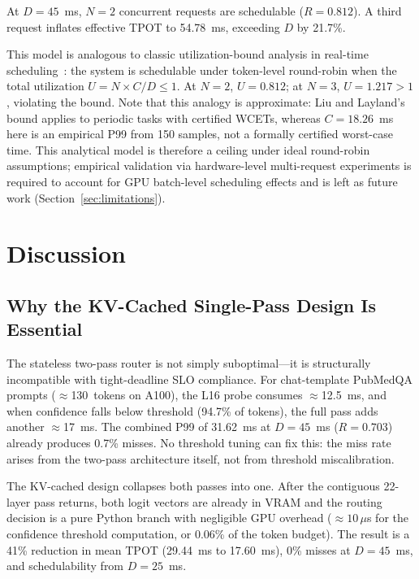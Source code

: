 \documentclass[conference]{IEEEtran}
\begin{document}
At $D=45$~ms, $N=2$ concurrent requests are schedulable ($R=0.812$).
A third request inflates effective TPOT to 54.78~ms, exceeding $D$ by 21.7\%.

This model is analogous to classic utilization-bound analysis in
real-time scheduling~\cite{liu1973scheduling}: the system is schedulable
under token-level round-robin when the total utilization
$U = N \times C / D \leq 1$.
At $N{=}2$, $U = 0.812$; at $N{=}3$, $U = 1.217 > 1$, violating the bound.
Note that this analogy is approximate: Liu and Layland's bound applies to
periodic tasks with certified WCETs, whereas $C = 18.26$~ms here is an
empirical P99 from 150 samples, not a formally certified worst-case time.
This analytical model is therefore a ceiling under ideal round-robin assumptions;
empirical validation via hardware-level multi-request experiments is
required to account for GPU batch-level scheduling effects and is
left as future work (Section~\ref{sec:limitations}).

\section{Discussion}

\subsection{Why the KV-Cached Single-Pass Design Is Essential}

The stateless two-pass router is not simply suboptimal---it is
structurally incompatible with tight-deadline SLO compliance.
For chat-template PubMedQA prompts ($\approx$130~tokens on A100), the
L16 probe consumes $\approx$12.5~ms, and when confidence falls below
threshold (94.7\% of tokens), the full pass adds another $\approx$17~ms.
The combined P99 of 31.62~ms at $D=45$~ms ($R=0.703$) already produces
0.7\% misses.
No threshold tuning can fix this: the miss rate arises from the two-pass
architecture itself, not from threshold miscalibration.

The KV-cached design collapses both passes into one.
After the contiguous 22-layer pass returns, both logit vectors are
already in VRAM and the routing decision is a pure Python branch with
negligible GPU overhead (${\approx}10\,\mu$s for the confidence threshold
computation, or 0.06\% of the token budget).
The result is a 41\% reduction in mean TPOT (29.44~ms to 17.60~ms),
0\% misses at $D=45$~ms, and schedulability from $D=25$~ms.
\end{document}
